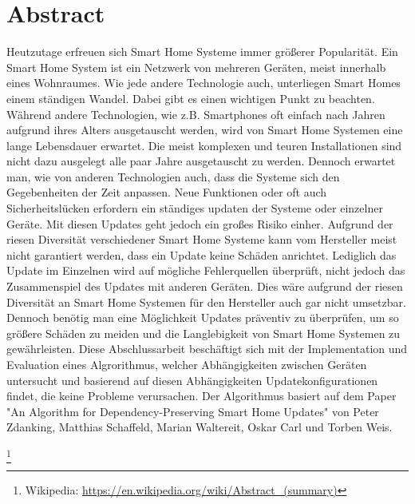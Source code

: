 \chapter*{Abstract}

Heutzutage erfreuen sich Smart Home Systeme immer größerer Popularität. Ein Smart Home System
ist ein Netzwerk von mehreren Geräten, meist innerhalb eines Wohnraumes. Wie  
jede andere Technologie auch, unterliegen Smart Homes einem ständigen Wandel. Dabei gibt es einen
wichtigen Punkt zu beachten. Während andere Technologien, wie z.B. Smartphones oft einfach 
nach Jahren aufgrund ihres Alters ausgetauscht werden, wird von Smart Home Systemen eine lange
Lebensdauer erwartet. Die meist komplexen und teuren Installationen sind nicht dazu ausgelegt alle paar Jahre 
ausgetauscht zu werden. Dennoch erwartet man, wie von anderen Technologien auch, dass die Systeme
sich den Gegebenheiten der Zeit anpassen. Neue Funktionen oder oft auch Sicherheitslücken erfordern 
ein ständiges updaten der Systeme oder einzelner Geräte. Mit diesen Updates geht jedoch ein großes Risiko 
einher. Aufgrund der riesen Diversität verschiedener Smart Home Systeme kann vom Hersteller meist nicht
garantiert werden, dass ein Update keine Schäden anrichtet. Lediglich das Update im Einzelnen wird auf 
mögliche Fehlerquellen überprüft, nicht jedoch das Zusammenspiel des Updates mit anderen Geräten.
Dies wäre aufgrund der riesen Diversität an Smart Home Systemen für den Hersteller auch gar nicht umsetzbar.
Dennoch benötig man eine Möglichkeit Updates präventiv zu überprüfen, um so größere Schäden zu meiden und 
die Langlebigkeit von Smart Home Systemen zu gewährleisten.
Diese Abschlussarbeit beschäftigt sich mit der Implementation und Evaluation eines Algrorithmus, welcher 
Abhängigkeiten zwischen Geräten untersucht und basierend auf diesen Abhängigkeiten Updatekonfigurationen 
findet, die keine Probleme verursachen.
Der Algorithmus basiert auf dem Paper "An Algorithm for Dependency-Preserving 
Smart Home Updates" von Peter Zdanking, Matthias Schaffeld, Marian Waltereit, Oskar Carl und Torben Weis. 






\footnote{Wikipedia: \url{https://en.wikipedia.org/wiki/Abstract_(summary)}}

